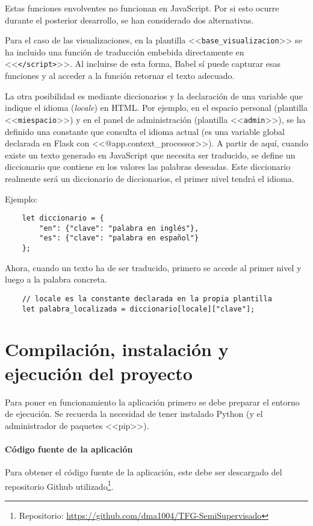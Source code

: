 Estas funciones envolventes no funcionan en JavaScript. Por si esto ocurre
durante el posterior desarrollo, se han considerado dos alternativas. 

Para el caso de las visualizaciones, en la plantilla
<<\texttt{base\_visualizacion}>> se ha incluido una función de traducción
embebida directamente en <<\texttt{</script>}>>. Al incluirse de esta forma,
Babel sí puede capturar esas funciones y al acceder a la función retornar el
texto adecuado. 

La otra posibilidad es mediante diccionarios y la declaración de una variable
que indique el idioma (\textit{locale}) en HTML. Por ejemplo, en el espacio
personal (plantilla <<\texttt{miespacio}>>) y en el panel de administración
(plantilla <<\texttt{admin}>>), se ha definido una constante que consulta el
idioma actual (es una variable global declarada en Flask con
<<@app.context\_processor>>). A partir de aquí, cuando existe un texto generado
en JavaScript que necesita ser traducido, se define un diccionario que contiene
en los valores las palabras deseadas. Este diccionario realmente será un
diccionario de diccionarios, el primer nivel tendrá el idioma.

Ejemplo:

\begin{verbatim}
    let diccionario = {
        "en": {"clave": "palabra en inglés"},
        "es": {"clave": "palabra en español"}
    };
\end{verbatim}

Ahora, cuando un texto ha de ser traducido, primero se accede al primer nivel y
luego a la palabra concreta.


\begin{verbatim}
    // locale es la constante declarada en la propia plantilla
    let palabra_localizada = diccionario[locale]["clave"];
\end{verbatim}

\section{Compilación, instalación y ejecución del proyecto}

Para poner en funcionamiento la aplicación primero se debe preparar el entorno
de ejecución. Se recuerda la necesidad de tener instalado Python (y el
administrador de paquetes <<pip>>).

\paragraph{Código fuente de la aplicación} Para obtener el código fuente de la
aplicación, este debe ser descargado del repositorio Github utilizado\footnote{
Repositorio: \url{https://github.com/dma1004/TFG-SemiSupervisado}}.

